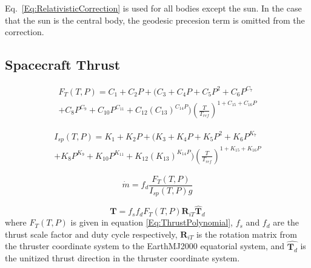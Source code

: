 Eq.~{\ref{Eq:RelativisticCorrection}} is used for all bodies except the sun.  In the case that the sun is the central body, the geodesic precesion term is omitted from the correction.



\subsection{Spacecraft Thrust}

\begin{footnotesize}

\begin{equation}
\begin{split}
    F_T(T,P) = C_1 + C_2 P +  (C_3 + C_4 P + C_5 P^2 + C_6 P^{C_7}\\ +  C_8P^{C_9}
     + C_{10}P^{C_{11}}
    + C_{12}(C_{13})^{C_{14}P})\left(\frac{T}{T_{ref}}\right)^{1 + C_{15} + C_{16}P }
    \label{Eq:ThrustPolynomial}
     \end{split}
\end{equation}

%
\begin{equation}
\begin{split}
    I_{sp}(T,P) = K_1 + K_2 P + (K_3 + K_4 P + K_5 P^2 + K_6 P^{K_7} \\ + K_8P^{K_9} + K_{10}P^{K_{11}}
    + K_{12}(K_{13})^{K_{14}P})\left(\frac{T}{T_{ref}}\right)^{1 + K_{15} + K_{16}P }
         \end{split}
\end{equation}
\end{footnotesize}

\begin{equation}
    \dot{m} =  f_d\frac{F_T(T,P)}{I_{sp}(T,P)g}
\end{equation}

\begin{equation}
    \mathbf{T} = f_s f_d F_T(T,P) \mathbf{R}_{iT}\hat{\mathbf{T}}_d
\end{equation}
%
where $F_T(T,P)$ is given in equation \ref{Eq:ThrustPolynomial},
$f_s$ and $f_d$ are the thrust scale factor and duty cycle
respectively, $\mathbf{R}_{iT}$ is the rotation matrix from the
thruster coordinate system to the EarthMJ2000 equatorial system, and
$\hat{\mathbf{T}_d}$ is the unitized thrust direction in the
thruster coordinate system.

